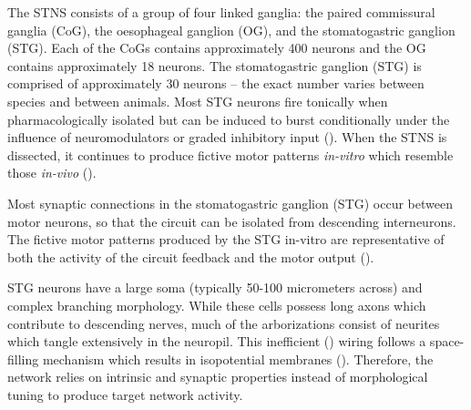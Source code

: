 \documentclass[14pt]{article}
\begin{document}
	The STNS consists of a group of four linked ganglia: the paired commissural ganglia (CoG), the  oesophageal ganglion (OG), and the stomatogastric ganglion (STG).  Each of the CoGs contains approximately 400 neurons and the OG contains approximately 18 neurons. The stomatogastric ganglion (STG)  is comprised of approximately 30 neurons – the exact number varies between species and between animals. Most STG neurons fire tonically when pharmacologically isolated but can be induced to burst conditionally under the influence of neuromodulators or graded inhibitory input (\cite{Harris-WarrickDynamicBiologicalNetworks1992}). When the STNS is dissected, it continues to produce fictive motor patterns \textit{in-vitro} which resemble those \textit{in-vivo} (\cite{Harris-WarrickDynamicBiologicalNetworks1992,Nusbaumsmallsystemsapproachmotor2002,SelverstonCrustaceanStomatogastricSystem1987}).
	
	Most synaptic connections in the stomatogastric ganglion (STG) occur between motor neurons, so that the circuit can be isolated from descending interneurons. The fictive motor patterns produced by the STG in-vitro are representative of both the activity of the circuit feedback and the motor output (\cite{MarderPrinciplesrhythmicmotor1996}).
	
	STG neurons have a large soma (typically 50-100 micrometers across) and complex branching morphology. While these cells possess long axons which contribute to descending nerves, much of the arborizations consist of neurites which tangle extensively in the neuropil. This inefficient (\cite{LoebOptimalisngood2012}) wiring follows a space-filling mechanism which results in isopotential membranes (\cite{OtopalikSloppymorphologicaltuning2017}). Therefore, the network relies on intrinsic and synaptic properties instead of morphological tuning to produce target network activity.
\end{document}
